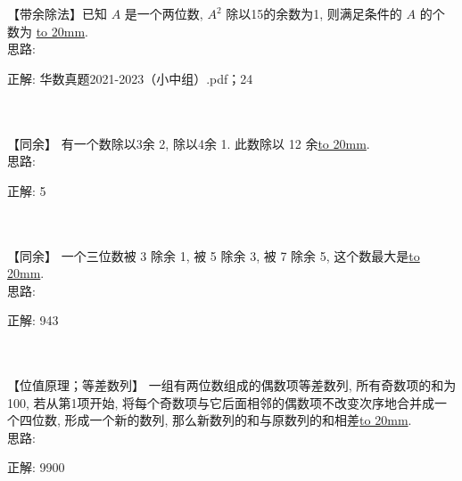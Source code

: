 \item {
    【带余除法】已知 $A$ 是一个两位数, $A^2$ 除以15的余数为1, 则满足条件的 $A$ 的个数为 \underline{\hbox to 20mm{}}.
    \ifshowSolution
        \fangsong{}
        \\
        思路:

        正解: 华数真题2021-2023（小中组）.pdf；24
    \else
        \\ \\ \\
    \fi
}

\item {
    【同余】
    有一个数除以3余 2, 除以4余 1. 此数除以 12 余\underline{\hbox to 20mm{}}.
    \ifshowSolution
        \fangsong{}
        \\
        思路:

        正解: 5
    \else
        \\ \\ \\
    \fi
}

\item {
    【同余】
    一个三位数被 3 除余 1, 被 5 除余 3, 被 7 除余 5, 这个数最大是\underline{\hbox to 20mm{}}.
    \ifshowSolution
        \fangsong{}
        \\
        思路:

        正解: 943
    \else
        \\ \\ \\
    \fi
}

\item {
    【位值原理；等差数列】
    一组有两位数组成的偶数项等差数列, 所有奇数项的和为100, 若从第1项开始, 将每个奇数项与它后面相邻的偶数项不改变次序地合并成一个四位数, 形成一个新的数列, 那么新数列的和与原数列的和相差\underline{\hbox to 20mm{}}.
    \ifshowSolution
        \fangsong{}
        \\
        思路:

        正解: 9900
    \else
        \\ \\ \\
    \fi
}
